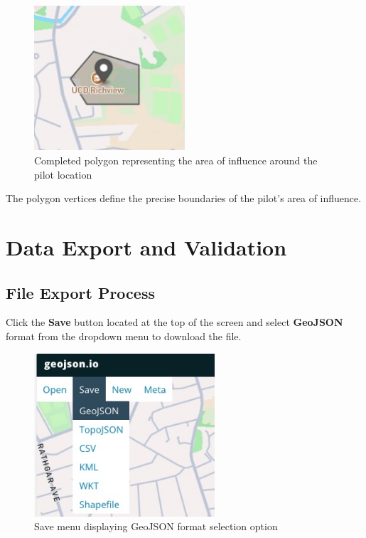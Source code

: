 \documentclass[11pt,a4paper]{article}
\begin{document}
\begin{figure}[H]
    \centering
    \includegraphics[width=0.5\textwidth]{img/step3_2.jpg}
    \caption{Completed polygon representing the area of influence around the pilot location}
    \label{fig:step3_2}
\end{figure}

The polygon vertices define the precise boundaries of the pilot's area of influence.

\section{Data Export and Validation}

\subsection{File Export Process}

Click the \textbf{Save} button located at the top of the screen and select \textbf{GeoJSON} format from the dropdown menu to download the file.

\begin{figure}[H]
    \centering
    \includegraphics[width=0.6\textwidth]{img/step4.jpg}
    \caption{Save menu displaying GeoJSON format selection option}
    \label{fig:step4}
\end{figure}
\end{document}
